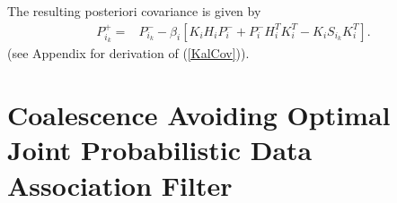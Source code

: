 \documentclass[letterpaper, 10pt, conference]{ieeeconf}
\newcommand{\bracket}[1]{\ensuremath{\left[ #1 \right]}}
\newcommand{\tr}[1]{\mathrm{tr}\ensuremath{\negthickspace\bracket{#1}}}
\newcommand{\EditTL}[1]{{\color{red}\protect #1}}
\begin{document}
The resulting posteriori covariance is given by
\begin{align}
\label{KalCov}
P^+_{i_k}=&P^-_{i_k}-\beta_i[K_iH_iP_i^-+P_i^-H_i^TK_i^T-K_iS_{i_k}K_i^T].
\end{align}
(see Appendix for derivation of (\ref{KalCov})).




\section{Coalescence Avoiding Optimal Joint Probabilistic Data Association Filter}%
\label{C-JPDAF}
\end{document}
